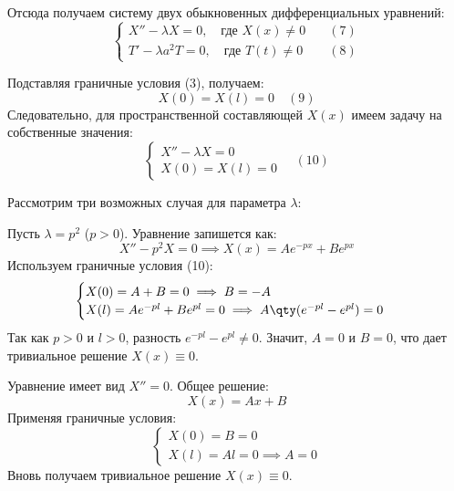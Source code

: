 Отсюда получаем систему двух обыкновенных дифференциальных уравнений:
\begin{equation}
	\begin{cases}
		X'' - \lambda X = 0, \quad \text{где } X(x) \neq 0 \quad &(7) \\
		T' - \lambda a^2 T = 0, \quad \text{где } T(t) \neq 0 \quad &(8)
	\end{cases}
\end{equation}

Подставляя граничные условия (3), получаем:
\begin{equation}
	X(0) = X(l) = 0 \quad (9)
\end{equation}
Следовательно, для пространственной составляющей $X(x)$ имеем задачу на собственные значения:
\begin{equation}
	\begin{cases}
		X'' - \lambda X = 0 \\
		X(0) = X(l) = 0
	\end{cases} \quad (10)
\end{equation}

Рассмотрим три возможных случая для параметра $\lambda$:

\begin{example}
	Пусть $\lambda = p^2$ ($p > 0$). Уравнение запишется как:
	\begin{equation}
		X'' - p^2 X = 0 \implies X(x) = A e^{-px} + B e^{px}
	\end{equation}
	Используем граничные условия (10):
	\begin{equation}
		\begin{cases}
			X(0) = A + B = 0 \implies B = -A \\
			X(l) = A e^{-pl} + B e^{pl} = 0 \implies A \qty( e^{-pl} - e^{pl} ) = 0
		\end{cases}
	\end{equation}
	Так как $p > 0$ и $l > 0$, разность $e^{-pl} - e^{pl} \neq 0$. Значит, $A=0$ и $B=0$, что дает тривиальное решение $X(x) \equiv 0$.
\end{example}

\begin{example}[Случай 2: $\lambda = 0$]
	Уравнение имеет вид $X'' = 0$. Общее решение:
	\begin{equation}
		X(x) = Ax + B
	\end{equation}
	Применяя граничные условия:
	\begin{equation}
		\begin{cases}
			X(0) = B = 0 \\
			X(l) = Al = 0 \implies A = 0
		\end{cases}
	\end{equation}
	Вновь получаем тривиальное решение $X(x) \equiv 0$.
\end{example}

